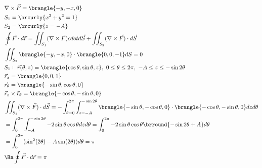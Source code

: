 \begin{align*}
    &\nabla\times\vec{F}=\brangle{-y,-x,0}\\
    &S_1=\brcurly{x^2+y^2=1}\\
    &S_2=\brcurly{z=-A}\\
    &\oint\vec{F}\cdot d\vec{r}=\iint_{S_1}(\nabla\times\vec{F})
    cdot d\vec{S}+\iint_{S_2}(\nabla\times\vec{F})\cdot d\vec{S}\\
    &\iint_{S_2}\brangle{-y,-x,0}\cdot\brangle{0,0,-1}dS=0\\
    &S_1:\ \vec{r}(\theta,z)=\brangle{\cos\theta,\sin\theta,z},\ 0\leq \theta\leq 2\pi,\ -A\leq z\leq -\sin 2\theta\\
    &\vec{r}_z=\brangle{0,0,1}\\
    &\vec{r}_\theta=\brangle{-\sin\theta,\cos\theta,0}\\
    &\vec{r}_z\times\vec{r}_\theta=\brangle{-\cos\theta,-\sin\theta,0}\\
    &\iint_{S_1}(\nabla\times\vec{F})\cdot d\vec{S}=-\int_{\theta=0}^{2\pi}\int_{z=-A}^{-\sin 2\theta}\brangle{-\sin\theta,-\cos\theta,0}\cdot\brangle{-\cos\theta,-\sin\theta,0}dzd\theta\\
    &=\int_0^{2\pi}\int_{-A}^{-\sin2\theta}-2\sin\theta\cos\theta dzd\theta=\int_0^{2\pi}-2\sin\theta\cos\theta\brround{-\sin2\theta+A}d\theta\\
    &=\int_0^{2\pi}(\sin^2(2\theta)-A\sin(2\theta))d\theta=\pi\\
    &\Ra\oint\vec{F}\cdot d\vec{r}=\pi
\end{align*}
